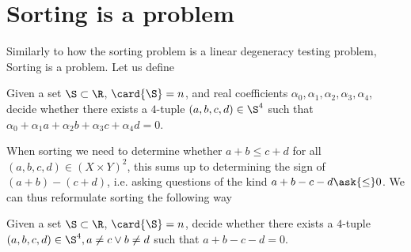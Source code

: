 \section{Sorting \XY is a \fourLDT problem}
\label{tree:related:xy4ldt}

Similarly to how the sorting problem is a linear degeneracy testing problem,
Sorting \XY is a \fourLDT problem. Let us define \fourLDT
\begin{problem}[\fourLDT]
Given a set $\S \subset \R$, $\card{\S} = n$, and real coefficients $\alpha_0,
\alpha_1, \alpha_2, \alpha_3, \alpha_4$, decide whether there exists a
\(4\)-tuple \((a,b,c,d) \in \S^4\) such that
$\alpha_0 + \alpha_1 a + \alpha_2 b + \alpha_3 c + \alpha_4 d = 0$.
\end{problem}

When sorting \XY we need to determine whether $a + b \le c + d$ for all
$(a,b,c,d) \in (X \times Y)^2$, this sums up to determining the sign of $(a+b) -
(c+d)$, i.e. asking questions of the kind $a + b - c - d \ask{\le} 0$. We can thus
reformulate sorting \XY the following way
\begin{problem}
Given a set $\S \subset \R$, $\card{\S} = n$, decide whether there exists a
\(4\)-tuple \((a,b,c,d) \in \S^4, a \neq c \lor b \neq d\) such
that $a + b - c - d = 0$.
\end{problem}

